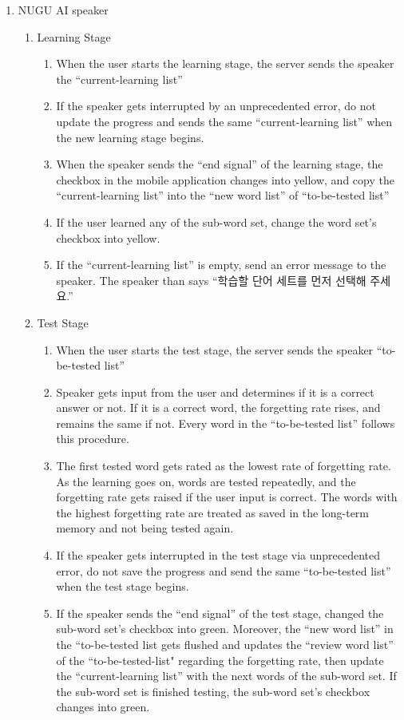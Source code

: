 \documentclass[conference]{IEEEtran}
\begin{document}
\begin{enumerate}
    \item NUGU AI speaker
    \begin{enumerate}
        \item Learning Stage
        \begin{enumerate}
            \item When the user starts the learning stage, the server sends the speaker the “current-learning list”
            \item If the speaker gets interrupted by an unprecedented error, do not update the progress and sends the same “current-learning list” when the new learning stage begins.
            \item When the speaker sends the “end signal” of the learning stage, the checkbox in the mobile application changes into yellow, and copy the “current-learning list” into the “new word list” of “to-be-tested list”
            \item If the user learned any of the sub-word set, change the word set’s checkbox into yellow.
            \item If the “current-learning list” is empty, send an error message to the speaker. The speaker than says “학습할 단어 세트를 먼저 선택해 주세요.”
        \end{enumerate}
        \item Test Stage
        \begin{enumerate}
            \item When the user starts the test stage, the server sends the speaker “to-be-tested list”
            \item Speaker gets input from the user and determines if it is a correct answer or not. If it is a correct word, the forgetting rate rises, and remains the same if not. Every word in the “to-be-tested list” follows this procedure.
            \item The first tested word gets rated as the lowest rate of forgetting rate. As the learning goes on, words are tested repeatedly, and the forgetting rate gets raised if the user input is correct. The words with the highest forgetting rate are treated as saved in the long-term memory and not being tested again.
            \item If the speaker gets interrupted in the test stage via unprecedented error, do not save the progress and send the same “to-be-tested list” when the test stage begins.
            \item If the speaker sends the “end signal” of the test stage, changed the sub-word set’s checkbox into green. Moreover, the “new word list” in the “to-be-tested list gets flushed and updates the “review word list” of the “to-be-tested-list" regarding the forgetting rate, then update the “current-learning list” with the next words of the sub-word set. If the sub-word set is finished testing, the sub-word set’s checkbox changes into green.

\end{enumerate}
\end{enumerate}
\end{enumerate}
\end{document}
